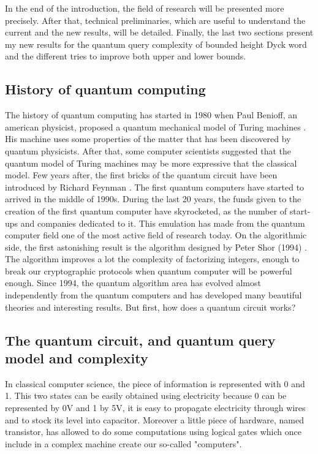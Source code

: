In the end of the introduction, the field of research will be presented more precisely.
After that, technical preliminaries, which are useful to understand the
current and the new results, will be detailed. Finally, the last two sections present my
new results for the quantum query complexity of bounded height Dyck word and the different
tries to improve both upper and lower bounds.

\subsection{History of quantum computing}

The history of quantum computing has started in 1980 when Paul Benioff, an american physicist,
proposed a quantum mechanical model of Turing machines \cite{art:paulbenioff}.
His machine uses some properties of the matter that has been discovered by quantum physicists.
After that, some computer scientists suggested that the quantum model of Turing machines may be
more expressive that the classical model. Few years after, the first bricks of the quantum circuit
have been introduced by Richard Feynman \cite{art:feymann}. The first quantum computers have started
to arrived in the middle of 1990s. During the last 20 years, the funds given to the creation of
the first quantum computer have skyrocketed, as the number of start-ups and companies dedicated to it.
This emulation has made from the quantum computer field one of the most active field of research today.
On the algorithmic side, the first astonishing result is the algorithm designed by Peter Shor (1994)
\cite{art:shor}. The algorithm improves a lot the complexity of factorizing integers, enough to break our
cryptographic protocols when quantum computer will be powerful enough. Since 1994, the
quantum algorithm area has evolved almost independently from the quantum computers and
has developed many beautiful theories and interesting results. But first, how does a quantum
circuit works?

\subsection{The quantum circuit, and quantum query model and complexity}

In classical computer science, the piece of information is represented with
0 and 1. This two states can be easily obtained using electricity because 0
can be represented by 0V and 1 by 5V, it is easy to propagate electricity
through wires and to stock its level into capacitor. Moreover a little piece
of hardware, named transistor, has allowed to do some computations using logical
gates which once include in a complex machine create our so-called "computers".

